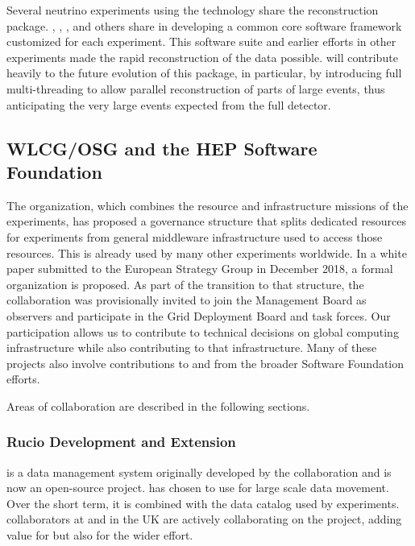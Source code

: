 Several neutrino experiments using the  technology share the \cite{Snider:2017wjd} reconstruction package.  , , , and others share in developing a common core software framework customized for each experiment. This software suite and earlier efforts in other experiments made the rapid reconstruction of the  data possible.   will contribute heavily to  the future evolution of this package, in particular, by introducing full multi-threading to allow parallel reconstruction of parts of large events, thus anticipating the very large events expected from the full detector. 

\subsection{WLCG/OSG and the HEP Software Foundation}
The  \cite{Bird:2014ctt} organization, which combines the resource and infrastructure missions of the  experiments, has proposed a governance structure that splits dedicated resources for  experiments from general middleware infrastructure used to access those resources.  This  is already used by many other experiments worldwide.  In a white paper submitted to the European Strategy Group in December 2018\cite{bib:BirdEUStrategy}, a formal  organization is proposed. As part of the transition to that structure, the  collaboration was provisionally invited to join the  Management Board as observers and participate in the Grid Deployment Board and task forces. Our participation allows us to contribute to technical decisions on global computing infrastructure while also contributing to that infrastructure. 
Many of these projects also involve contributions to and from the broader  Software Foundation efforts. 

Areas of collaboration are described in the following sections. 

\subsubsection{Rucio Development and Extension}

 \cite{Barisits:2019fyl}
is a data management system originally developed by the  collaboration and is now an open-source project.   has chosen to use  for large scale data movement.  Over the short term, it is combined with the  data catalog used by  experiments.   collaborators at  and in the UK are actively collaborating on the  project, adding value for  but also for the wider effort.


